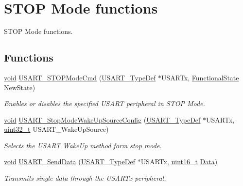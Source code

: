 \hypertarget{group___u_s_a_r_t___group2}{\section{S\-T\-O\-P Mode functions}
\label{group___u_s_a_r_t___group2}
}


S\-T\-O\-P Mode functions.  


\subsection*{Functions}
\begin{DoxyCompactItemize}
\item 
\hyperlink{group___n_a_m_e_ga18028b8badbf1ea7e704ccac3c488e82}{void} \hyperlink{group___u_s_a_r_t___group2_ga98d0c4eea119aca09dc613ca68a6343c}{U\-S\-A\-R\-T\-\_\-\-S\-T\-O\-P\-Mode\-Cmd} (\hyperlink{struct_u_s_a_r_t___type_def}{U\-S\-A\-R\-T\-\_\-\-Type\-Def} $\ast$U\-S\-A\-R\-Tx, \hyperlink{group___exported__types_gac9a7e9a35d2513ec15c3b537aaa4fba1}{Functional\-State} New\-State)
\begin{DoxyCompactList}\small\item\em Enables or disables the specified U\-S\-A\-R\-T peripheral in S\-T\-O\-P Mode. \end{DoxyCompactList}\item 
\hyperlink{group___n_a_m_e_ga18028b8badbf1ea7e704ccac3c488e82}{void} \hyperlink{group___u_s_a_r_t___group2_gab0b86fa8327ca171e0b272fb4338bd30}{U\-S\-A\-R\-T\-\_\-\-Stop\-Mode\-Wake\-Up\-Source\-Config} (\hyperlink{struct_u_s_a_r_t___type_def}{U\-S\-A\-R\-T\-\_\-\-Type\-Def} $\ast$U\-S\-A\-R\-Tx, \hyperlink{stdint_8h_a435d1572bf3f880d55459d9805097f62}{uint32\-\_\-t} U\-S\-A\-R\-T\-\_\-\-Wake\-Up\-Source)
\begin{DoxyCompactList}\small\item\em Selects the U\-S\-A\-R\-T Wake\-Up method form stop mode. \end{DoxyCompactList}\item 
\hyperlink{group___n_a_m_e_ga18028b8badbf1ea7e704ccac3c488e82}{void} \hyperlink{group___u_s_a_r_t___group2_ga0b43d42da9540f446d494bf69823c6fb}{U\-S\-A\-R\-T\-\_\-\-Send\-Data} (\hyperlink{struct_u_s_a_r_t___type_def}{U\-S\-A\-R\-T\-\_\-\-Type\-Def} $\ast$U\-S\-A\-R\-Tx, \hyperlink{stdint_8h_a273cf69d639a59973b6019625df33e30}{uint16\-\_\-t} \hyperlink{group___copter_control_b_l_ga6f3335509cc4943e20df66f72483910c}{Data})
\begin{DoxyCompactList}\small\item\em Transmits single data through the U\-S\-A\-R\-Tx peripheral. \end{DoxyCompactList}\item 

\end{DoxyCompactItemize}
